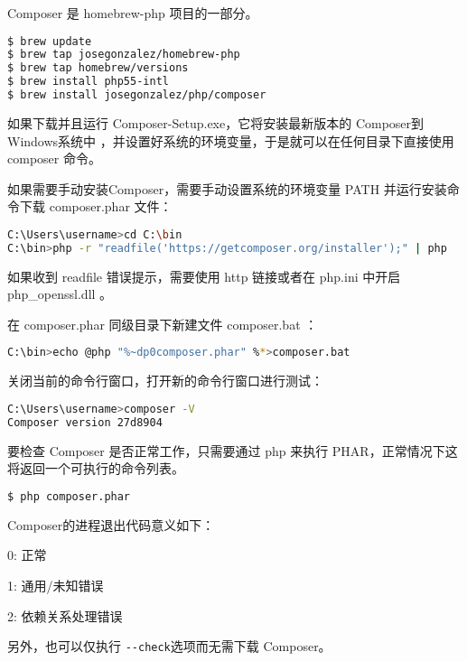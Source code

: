 Composer 是 homebrew-php 项目的一部分。

\begin{lstlisting}[language=bash]
$ brew update
$ brew tap josegonzalez/homebrew-php
$ brew tap homebrew/versions
$ brew install php55-intl
$ brew install josegonzalez/php/composer
\end{lstlisting}

如果下载并且运行 Composer-Setup.exe，它将安装最新版本的 Composer到Windows系统中 ，并设置好系统的环境变量，于是就可以在任何目录下直接使用 composer 命令。

如果需要手动安装Composer，需要手动设置系统的环境变量 PATH 并运行安装命令下载 composer.phar 文件：

\begin{lstlisting}[language=bash]
C:\Users\username>cd C:\bin
C:\bin>php -r "readfile('https://getcomposer.org/installer');" | php
\end{lstlisting}

如果收到 readfile 错误提示，需要使用 http 链接或者在 php.ini 中开启 php\_openssl.dll 。

在 composer.phar 同级目录下新建文件 composer.bat ：

\begin{lstlisting}[language=bash]
C:\bin>echo @php "%~dp0composer.phar" %*>composer.bat
\end{lstlisting}

关闭当前的命令行窗口，打开新的命令行窗口进行测试：

\begin{lstlisting}[language=bash]
C:\Users\username>composer -V
Composer version 27d8904
\end{lstlisting}

要检查 Composer 是否正常工作，只需要通过 php 来执行 PHAR，正常情况下这将返回一个可执行的命令列表。

\begin{lstlisting}[language=bash]
$ php composer.phar
\end{lstlisting}

Composer的进程退出代码意义如下：

\begin{compactitem}
\item 0: 正常
\item 1: 通用/未知错误
\item 2: 依赖关系处理错误
\end{compactitem}

另外，也可以仅执行 \texttt{-\/-check}选项而无需下载 Composer。 

